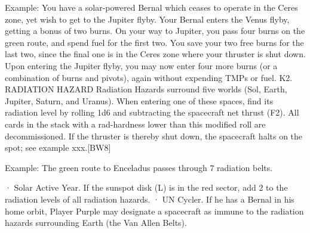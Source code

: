 \documentclass[a4paper]{book}
\begin{document}
Example: You have a solar-powered Bernal which ceases to operate in the Ceres zone, yet wish to get to the Jupiter flyby. Your Bernal enters the Venus flyby, getting a bonus of two burns. On your way to Jupiter, you pass four burns on the green route, and spend fuel for the first two. You save your two free burns for the last two, since the final one is in the Ceres zone where your thruster is shut down. Upon entering the Jupiter flyby, you may now enter four more burns (or a combination of burns and pivots), again without expending TMPs or fuel.
K2. RADIATION HAZARD
Radiation Hazards surround five worlds (Sol, Earth, Jupiter, Saturn, and Uranus). When entering one of these spaces, find its radiation level by rolling 1d6 and subtracting the spacecraft net thrust (F2). All cards in the stack with a rad-hardness lower than this modified roll are decommissioned. If the thruster is thereby shut down, the spacecraft halts on the spot; see example xxx.[BW8] 

Example: The green route to Enceladus passes through 7 radiation belts.

·       Solar Active Year. If the sunspot disk (L) is in the red sector, add 2 to the radiation levels of all radiation hazards.
·       UN Cycler. If he has a Bernal in his home orbit, Player Purple may designate a spacecraft as immune to the radiation hazards surrounding Earth (the Van Allen Belts).
\end{document}
